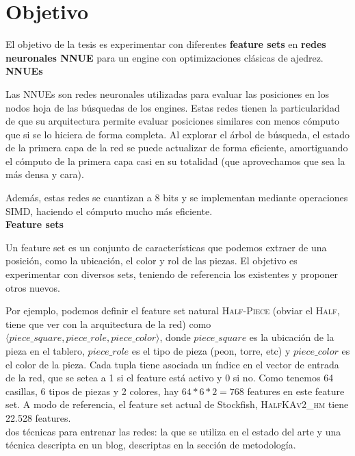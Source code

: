 \newpage
\section*{Objetivo}

El objetivo de la tesis es experimentar con diferentes \textbf{feature sets} en \textbf{redes neuronales NNUE} para un engine con optimizaciones clásicas de ajedrez. \\

\textbf{NNUEs}

Las NNUEs son redes neuronales utilizadas para evaluar las posiciones en los nodos hoja de las búsquedas de los engines. Estas redes tienen la particularidad de que su arquitectura permite evaluar posiciones similares con menos cómputo que si se lo hiciera de forma completa. Al explorar el árbol de búsqueda, el estado de la primera capa de la red se puede actualizar de forma eficiente, amortiguando el cómputo de la primera capa casi en su totalidad (que aprovechamos que sea la más densa y cara).

Además, estas redes se cuantizan a 8 bits y se implementan mediante operaciones SIMD, haciendo el cómputo mucho más eficiente. \\

\textbf{Feature sets}

Un feature set es un conjunto de características que podemos extraer de una posición, como la ubicación, el color y rol de las piezas. El objetivo es experimentar con diversos sets, teniendo de referencia los existentes y proponer otros nuevos.

Por ejemplo, podemos definir el feature set natural \textsc{Half-Piece} (obviar el \textsc{Half}, tiene que ver con la arquitectura de la red) como $\langle piece\_square, piece\_role, piece\_color \rangle$, donde $piece\_square$ es la ubicación de la pieza en el tablero, $piece\_role$ es el tipo de pieza (peon, torre, etc) y $piece\_color$ es el color de la pieza. Cada tupla tiene asociada un índice en el vector de entrada de la red, que se setea a 1 si el feature está activo y 0 si no. Como tenemos 64 casillas, 6 tipos de piezas y 2 colores, hay $64*6*2=768$ features en este feature set.
A modo de referencia, el feature set actual de Stockfish, \textsc{HalfKAv2\_hm} tiene 22.528 features. \\



dos técnicas para entrenar las redes: la que se utiliza en el estado del arte y una técnica descripta en un blog, descriptas en la sección de metodología. \\
